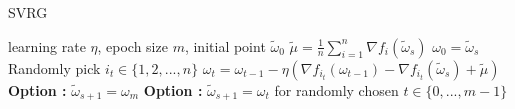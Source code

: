 \documentclass[conference]{IEEEtran}
\begin{document}

 \begin{algorithm}[t]
 	\caption{\textsc{SVRG}}
	\label{SVRG}
	\begin{algorithmic}[1]
	\Require learning rate $\eta$,  epoch size $m$, initial point $\tilde{\omega}_0$
		\State $\tilde{\mu} = \frac{1}{n}\sum\limits_{i=1}^{n}\nabla f_{i}(\tilde{\omega}_{s})$
		\State $\omega_0 = \tilde{\omega}_s$
			\State Randomly pick $i_t\in\{1, 2, ..., n\}$
			\State $\omega_t = \omega_{t-1} - \eta(\nabla f_{i_t}(\omega_{t-1}) - \nabla f_{i_t}(\tilde{\omega}_s)+\tilde{\mu})$
		\EndFor
		\State \textbf{Option \uppercase\expandafter{}:} $\tilde{\omega}_{s+1} = \omega_{m}$
		\State \textbf{Option \uppercase\expandafter{}:} $\tilde{\omega}_{s+1} = \omega_{t}$ for randomly chosen $t \in \{0, ... ,m - 1\}$ 
	\EndFor
	\end{algorithmic}
\end{algorithm}
\end{document}
